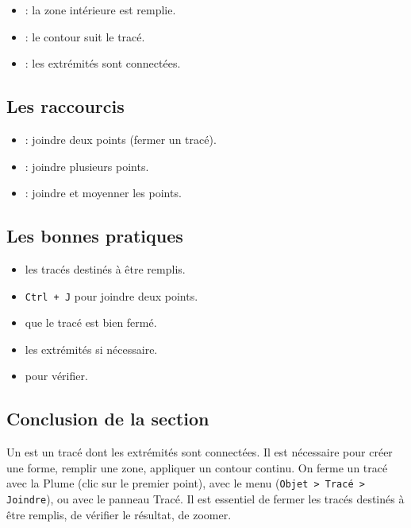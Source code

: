 \begin{itemize}
    \item {} : la zone intérieure est remplie.
    \item {} : le contour suit le tracé.
    \item {} : les extrémités sont connectées.
\end{itemize}

\subsection{Les raccourcis}

\begin{itemize}
    \item {} : joindre deux points (fermer un tracé).
    \item {} : joindre plusieurs points.
    \item {} : joindre et moyenner les points.
\end{itemize}

\subsection{Les bonnes pratiques}

\begin{itemize}
    \item {} les tracés destinés à être remplis.
    \item {} \texttt{Ctrl + J} pour joindre deux points.
    \item {} que le tracé est bien fermé.
    \item {} les extrémités si nécessaire.
    \item {} pour vérifier.
\end{itemize}

\subsection*{Conclusion de la section}

Un  est un tracé dont les extrémités sont connectées. Il est nécessaire pour créer une forme, remplir une zone, appliquer un contour continu. On ferme un tracé avec la Plume (clic sur le premier point), avec le menu (\texttt{Objet > Tracé > Joindre}), ou avec le panneau Tracé. Il est essentiel de fermer les tracés destinés à être remplis, de vérifier le résultat, de zoomer.

